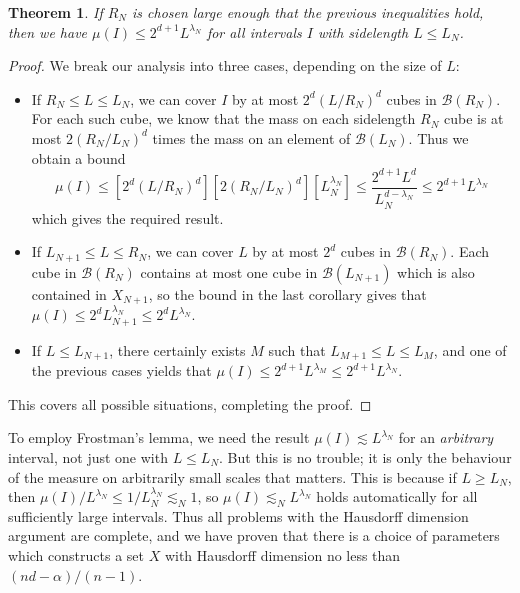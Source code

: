 \documentclass{article}
\theoremstyle{plain}
\theoremstyle{plain}
\newtheorem{theorem}{Theorem}
\begin{document}
\begin{multicols}{2}
\begin{theorem}
	If $R_N$ is chosen large enough that the previous inequalities hold, then we have $\mu(I) \leq 2^{d+1} L^{\lambda_N}$ for all intervals $I$ with sidelength $L \leq L_N$.
\end{theorem}
\begin{proof}
	We break our analysis into three cases, depending on the size of $L$:
	\begin{itemize}
		\item If $R_N \leq L \leq L_N$, we can cover $I$ by at most $2^d(L/R_N)^d$ cubes in $\mathcal{B}(R_N)$. For each such cube, we know that the mass on each sidelength $R_N$ cube is at most $2(R_N/L_N)^d$ times the mass on an element of $\mathcal{B}(L_N)$. Thus we obtain a bound
		\[ \mu(I) \leq [2^d(L/R_N)^d] [2(R_N/L_N)^d] [L_N^{\lambda_N}] \leq \frac{2^{d+1} L^d}{L_N^{d - \lambda_N}} \leq 2^{d+1} L^{\lambda_N} \]
		which gives the required result.

		\item If $L_{N+1} \leq L \leq R_N$, we can cover $L$ by at most $2^d$ cubes in $\mathcal{B}(R_N)$. Each cube in $\mathcal{B}(R_N)$ contains at most one cube in $\mathcal{B}(L_{N+1})$ which is also contained in $X_{N+1}$, so the bound in the last corollary gives that $\mu(I) \leq 2^d L_{N+1}^{\lambda_N} \leq 2^d L^{\lambda_N}$.

		\item If $L \leq L_{N+1}$, there certainly exists $M$ such that $L_{M+1} \leq L \leq L_M$, and one of the previous cases yields that $\mu(I) \leq 2^{d+1} L^{\lambda_M} \leq 2^{d+1} L^{\lambda_N}$.
	\end{itemize}
	This covers all possible situations, completing the proof.
\end{proof}

To employ Frostman's lemma, we need the result $\mu(I) \lesssim L^{\lambda_N}$ for an {\it arbitrary} interval, not just one with $L \leq L_N$. But this is no trouble; it is only the behaviour of the measure on arbitrarily small scales that matters. This is because if $L \geq L_N$, then $\mu(I)/L^{\lambda_N} \leq 1/L_N^{\lambda_N} \lesssim_N 1$, so $\mu(I) \lesssim_N L^{\lambda_N}$ holds automatically for all sufficiently large intervals. Thus all problems with the Hausdorff dimension argument are complete, and we have proven that there is a choice of parameters which constructs a set $X$ with Hausdorff dimension no less than $(nd - \alpha)/(n-1)$.

\end{multicols}
\end{document}
